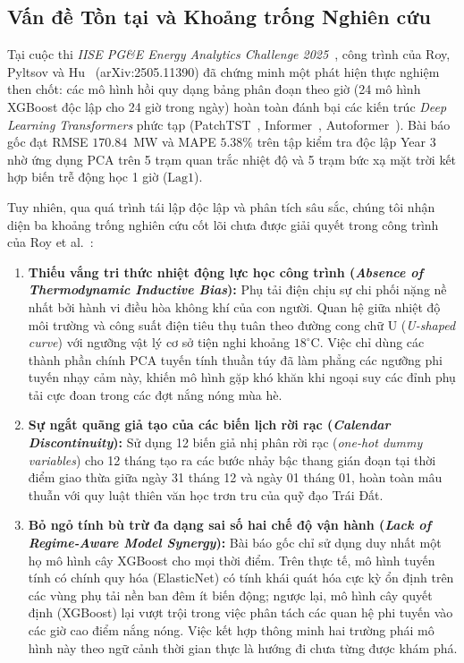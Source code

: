 \subsection{Vấn đề Tồn tại và Khoảng trống Nghiên cứu}
Tại cuộc thi \textit{IISE PG\&E Energy Analytics Challenge 2025}~\cite{pge2025zenodo}, công trình của Roy, Pyltsov và Hu~\cite{roy2025hourly} (arXiv:2505.11390) đã chứng minh một phát hiện thực nghiệm then chốt: các mô hình hồi quy dạng bảng phân đoạn theo giờ (24 mô hình XGBoost độc lập cho 24 giờ trong ngày) hoàn toàn đánh bại các kiến trúc \textit{Deep Learning Transformers} phức tạp (PatchTST~\cite{nie2023time}, Informer~\cite{zhou2021informer}, Autoformer~\cite{wu2021autoformer}). Bài báo gốc đạt RMSE $170.84$~MW và MAPE $5.38\%$ trên tập kiểm tra độc lập Year 3 nhờ ứng dụng PCA trên 5 trạm quan trắc nhiệt độ và 5 trạm bức xạ mặt trời kết hợp biến trễ động học 1 giờ ($\text{Lag1}$).

Tuy nhiên, qua quá trình tái lập độc lập và phân tích sâu sắc, chúng tôi nhận diện ba khoảng trống nghiên cứu cốt lõi chưa được giải quyết trong công trình của Roy et al.~\cite{roy2025hourly}:
\begin{enumerate}
    \item \textbf{Thiếu vắng tri thức nhiệt động lực học công trình (\textit{Absence of Thermodynamic Inductive Bias}):} Phụ tải điện chịu sự chi phối nặng nề nhất bởi hành vi điều hòa không khí của con người. Quan hệ giữa nhiệt độ môi trường và công suất điện tiêu thụ tuân theo đường cong chữ U (\textit{U-shaped curve}) với ngưỡng vật lý cơ sở tiện nghi khoảng $18^\circ\text{C}$. Việc chỉ dùng các thành phần chính PCA tuyến tính thuần túy đã làm phẳng các ngưỡng phi tuyến nhạy cảm này, khiến mô hình gặp khó khăn khi ngoại suy các đỉnh phụ tải cực đoan trong các đợt nắng nóng mùa hè.
    \item \textbf{Sự ngắt quãng giả tạo của các biến lịch rời rạc (\textit{Calendar Discontinuity}):} Sử dụng 12 biến giả nhị phân rời rạc (\textit{one-hot dummy variables}) cho 12 tháng tạo ra các bước nhảy bậc thang gián đoạn tại thời điểm giao thừa giữa ngày 31 tháng 12 và ngày 01 tháng 01, hoàn toàn mâu thuẫn với quy luật thiên văn học trơn tru của quỹ đạo Trái Đất.
    \item \textbf{Bỏ ngỏ tính bù trừ đa dạng sai số hai chế độ vận hành (\textit{Lack of Regime-Aware Model Synergy}):} Bài báo gốc chỉ sử dụng duy nhất một họ mô hình cây XGBoost cho mọi thời điểm. Trên thực tế, mô hình tuyến tính có chính quy hóa (ElasticNet) có tính khái quát hóa cực kỳ ổn định trên các vùng phụ tải nền ban đêm ít biến động; ngược lại, mô hình cây quyết định (XGBoost) lại vượt trội trong việc phân tách các quan hệ phi tuyến vào các giờ cao điểm nắng nóng. Việc kết hợp thông minh hai trường phái mô hình này theo ngữ cảnh thời gian thực là hướng đi chưa từng được khám phá.
\end{enumerate}

